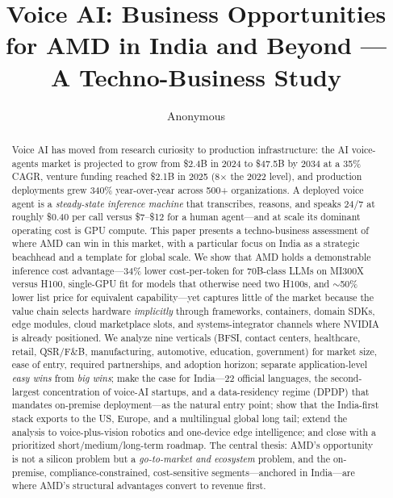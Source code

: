 \documentclass[blind]{gtac}
\title{{Voice AI: Business Opportunities for AMD in India and Beyond — A Techno-Business Study}}
\author{Anonymous}
\begin{document}
\maketitle

\pagestyle{fancy}
\fancyhf{}
\cfoot{\thepage}
\renewcommand{\headrulewidth}{0pt}
\thispagestyle{fancy}

\begin{abstract}
Voice AI has moved from research curiosity to production infrastructure: the AI voice-agents market is projected to grow from \$2.4B in 2024 to \$47.5B by 2034 at a 35\% CAGR, venture funding reached \$2.1B in 2025 (8$\times$ the 2022 level), and production deployments grew 340\% year-over-year across 500+ organizations. A deployed voice agent is a \emph{steady-state inference machine} that transcribes, reasons, and speaks 24/7 at roughly \$0.40 per call versus \$7--\$12 for a human agent---and at scale its dominant operating cost is GPU compute. This paper presents a techno-business assessment of where AMD can win in this market, with a particular focus on India as a strategic beachhead and a template for global scale. We show that AMD holds a demonstrable inference cost advantage---34\% lower cost-per-token for 70B-class LLMs on MI300X versus H100, single-GPU fit for models that otherwise need two H100s, and $\sim$50\% lower list price for equivalent capability---yet captures little of the market because the value chain selects hardware \emph{implicitly} through frameworks, containers, domain SDKs, edge modules, cloud marketplace slots, and systems-integrator channels where NVIDIA is already positioned. We analyze nine verticals (BFSI, contact centers, healthcare, retail, QSR/F\&B, manufacturing, automotive, education, government) for market size, ease of entry, required partnerships, and adoption horizon; separate application-level \emph{easy wins} from \emph{big wins}; make the case for India---22 official languages, the second-largest concentration of voice-AI startups, and a data-residency regime (DPDP) that mandates on-premise deployment---as the natural entry point; show that the India-first stack exports to the US, Europe, and a multilingual global long tail; extend the analysis to voice-plus-vision robotics and one-device edge intelligence; and close with a prioritized short/medium/long-term roadmap. The central thesis: AMD's opportunity is not a silicon problem but a \emph{go-to-market and ecosystem} problem, and the on-premise, compliance-constrained, cost-sensitive segments---anchored in India---are where AMD's structural advantages convert to revenue first.
\end{abstract}
\end{document}
